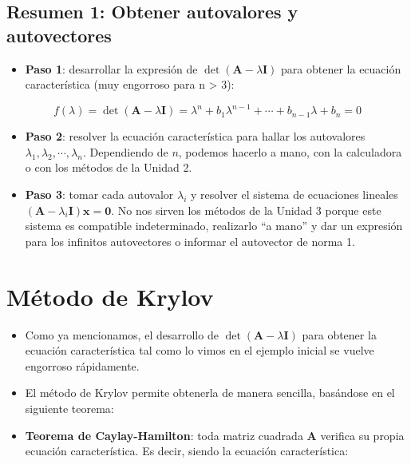 \documentclass[openany]{book}
\providecommand{\tightlist}{%
  \setlength{\itemsep}{0pt}\setlength{\parskip}{0pt}}
\begin{document}
\hypertarget{resumen-1-obtener-autovalores-y-autovectores}{%
\subsection{Resumen 1: Obtener autovalores y autovectores}\label{resumen-1-obtener-autovalores-y-autovectores}}

\begin{itemize}
\tightlist
\item
  \textbf{Paso 1}: desarrollar la expresión de \(\det(\textbf{A} - \lambda \textbf{I})\) para obtener la ecuación característica (muy engorroso para n \textgreater{} 3):
\end{itemize}

\[
f(\lambda) = \det(\textbf{A} - \lambda \textbf{I}) = \lambda^n + b_1 \lambda^{n-1} + \cdots + b_{n-1} \lambda + b_n = 0
\]

\begin{itemize}
\item
  \textbf{Paso 2}: resolver la ecuación característica para hallar los autovalores \(\lambda_1, \lambda_2, \cdots, \lambda_n\). Dependiendo de \(n\), podemos hacerlo a mano, con la calculadora o con los métodos de la Unidad 2.
\item
  \textbf{Paso 3}: tomar cada autovalor \(\lambda_i\) y resolver el sistema de ecuaciones lineales \((\textbf{A} - \lambda_i \textbf{I}) \textbf{x} = \textbf{0}\). No nos sirven los métodos de la Unidad 3 porque este sistema es compatible indeterminado, realizarlo ``a mano'' y dar un expresión para los infinitos autovectores o informar el autovector de norma 1.
\end{itemize}

\hypertarget{muxe9todo-de-krylov}{%
\section{Método de Krylov}\label{muxe9todo-de-krylov}}

\begin{itemize}
\item
  Como ya mencionamos, el desarrollo de \(\det(\textbf{A} - \lambda \textbf{I})\) para obtener la ecuación característica tal como lo vimos en el ejemplo inicial se vuelve engorroso rápidamente.
\item
  El método de Krylov permite obtenerla de manera sencilla, basándose en el siguiente teorema:
\item
  \textbf{Teorema de Caylay-Hamilton}: toda matriz cuadrada \(\textbf{A}\) verifica su propia ecuación característica. Es decir, siendo la ecuación característica:
\end{itemize}
\end{document}
